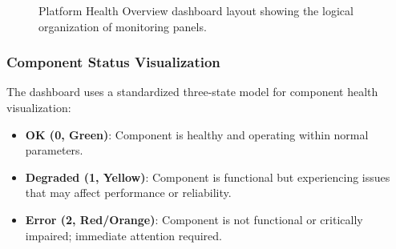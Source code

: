 \begin{figure}[ht]
\centering
{}
\caption{Platform Health Overview dashboard layout showing the logical organization of monitoring panels.}
\label{fig:dashboard-layout}
\end{figure}

\subsubsection{Component Status Visualization}

The dashboard uses a standardized three-state model for component health visualization:

\begin{itemize}
    \item \textbf{OK (0, Green)}: Component is healthy and operating within normal parameters.
    \item \textbf{Degraded (1, Yellow)}: Component is functional but experiencing issues that may affect performance or reliability.
    \item \textbf{Error (2, Red/Orange)}: Component is not functional or critically impaired; immediate attention required.
\end{itemize}

